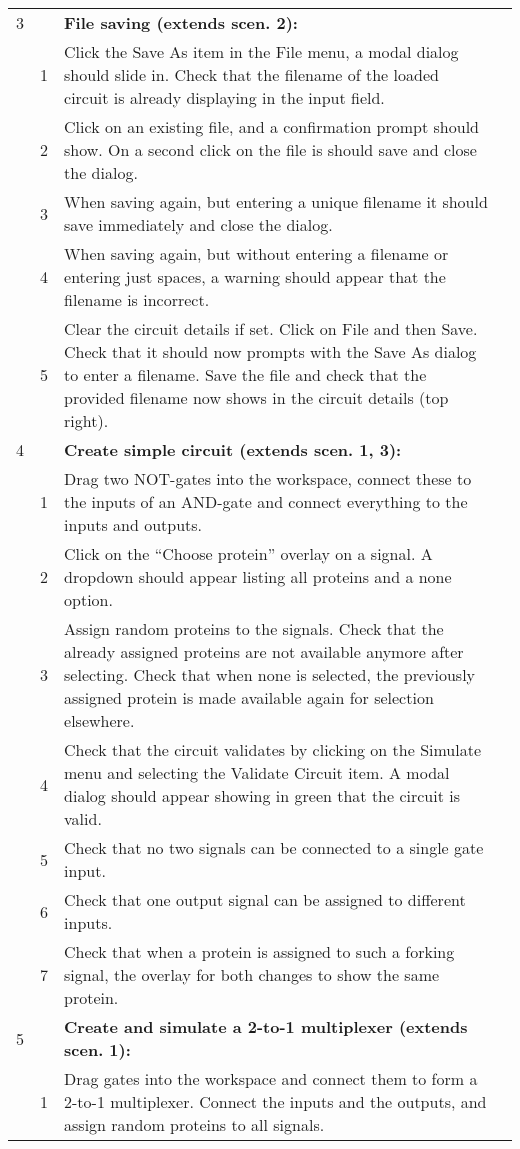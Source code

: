 \documentclass{article}
\begin{document}
\begin{center}
\begin{longtable}{r r  p{} l }
3 & & \textbf{File saving (extends scen. 2):}\\
&1& Click the Save As item in the File menu, a modal dialog should slide in. Check that the filename of the loaded circuit is already displaying in the input field.\\
&2& Click on an existing file, and a confirmation prompt should show.
On a second click on the file is should save and close the dialog.\\
&3& When saving again, but entering a unique filename it should save immediately and close the dialog.\\
&4& When saving again, but without entering a filename or entering just spaces, a warning should appear that the filename is incorrect.\\
&5& Clear the circuit details if set. Click on File and then Save. Check that it should now prompts with the Save As dialog to enter a filename. Save the file and check that the provided filename now shows in the circuit details (top right).\\ \midrule
4 & & \textbf{Create simple circuit (extends scen. 1, 3):}\\
&1& Drag two NOT-gates into the workspace, connect these to the inputs of an AND-gate and connect everything to the inputs and outputs.\\
&2& Click on the ``Choose protein'' overlay on a signal. A dropdown should appear listing all proteins and a none option.\\
&3& Assign random proteins to the signals. Check that the already assigned proteins are not available anymore after selecting. Check that when none is selected, the previously assigned protein is made available again for selection elsewhere.\\
&4& Check that the circuit validates by clicking on the Simulate menu and selecting the Validate Circuit item. A modal dialog should appear showing in green that the circuit is valid.\\
&5& Check that no two signals can be connected to a single gate input.\\
&6& Check that one output signal can be assigned to different inputs.\\
&7& Check that when a protein is assigned to such a forking signal, the overlay for both changes to show the same protein.\\ \midrule
5 & & \textbf{Create and simulate a 2-to-1 multiplexer (extends scen. 1):}\\
&1& Drag gates into the workspace and connect them to form a 2-to-1 multiplexer. Connect the inputs and the outputs, and assign random proteins to all signals.\\

\end{longtable}
\end{center}
\end{document}
